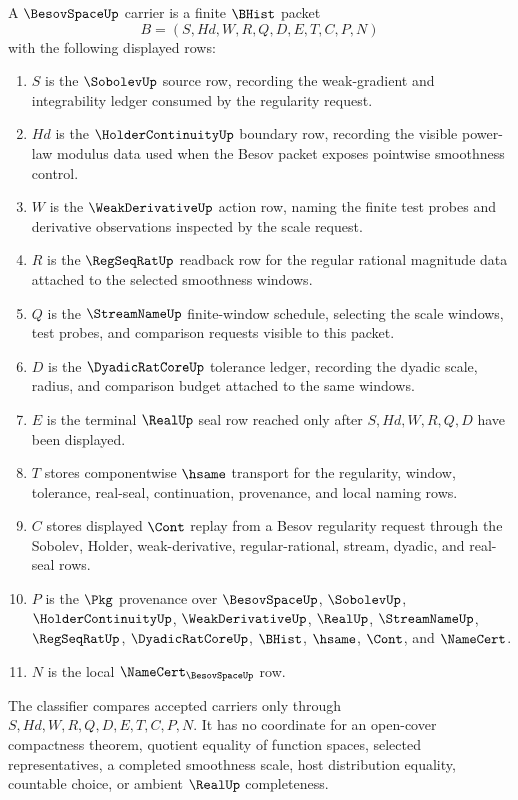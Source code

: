 \begin{definition}
\label{def:besov-space-carrier}
A $\BesovSpaceUp$ carrier is a finite $\BHist$ packet
$$
B=(S,Hd,W,R,Q,D,E,T,C,P,N)
$$
with the following displayed rows:
\begin{enumerate}
\item $S$ is the $\SobolevUp$ source row, recording the weak-gradient and integrability ledger consumed by the regularity request.
\item $Hd$ is the $\HolderContinuityUp$ boundary row, recording the visible power-law modulus data used when the Besov packet exposes pointwise smoothness control.
\item $W$ is the $\WeakDerivativeUp$ action row, naming the finite test probes and derivative observations inspected by the scale request.
\item $R$ is the $\RegSeqRatUp$ readback row for the regular rational magnitude data attached to the selected smoothness windows.
\item $Q$ is the $\StreamNameUp$ finite-window schedule, selecting the scale windows, test probes, and comparison requests visible to this packet.
\item $D$ is the $\DyadicRatCoreUp$ tolerance ledger, recording the dyadic scale, radius, and comparison budget attached to the same windows.
\item $E$ is the terminal $\RealUp$ seal row reached only after $S,Hd,W,R,Q,D$ have been displayed.
\item $T$ stores componentwise $\hsame$ transport for the regularity, window, tolerance, real-seal, continuation, provenance, and local naming rows.
\item $C$ stores displayed $\Cont$ replay from a Besov regularity request through the Sobolev, Holder, weak-derivative, regular-rational, stream, dyadic, and real-seal rows.
\item $P$ is the $\Pkg$ provenance over $\BesovSpaceUp$, $\SobolevUp$, $\HolderContinuityUp$, $\WeakDerivativeUp$, $\RealUp$, $\StreamNameUp$, $\RegSeqRatUp$, $\DyadicRatCoreUp$, $\BHist$, $\hsame$, $\Cont$, and $\NameCert$.
\item $N$ is the local $\NameCert_{\BesovSpaceUp}$ row.
\end{enumerate}
The classifier compares accepted carriers only through $S,Hd,W,R,Q,D,E,T,C,P,N$. It has no coordinate for an open-cover compactness theorem, quotient equality of function spaces, selected representatives, a completed smoothness scale, host distribution equality, countable choice, or ambient $\RealUp$ completeness.
\end{definition}

